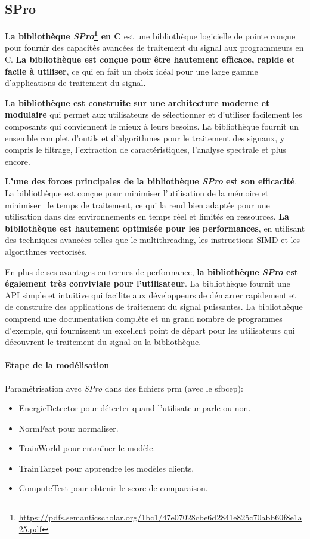 \subsection{SPro}
\label{subsec:SPro}

\textbf{La bibliothèque \textit{SPro}\footnote{\url{https://pdfs.semanticscholar.org/1bc1/47e07028cbe6d2841e825c70abb60f8e1a25.pdf}} en C} est une bibliothèque logicielle de pointe conçue pour fournir des capacités avancées de traitement du signal
aux programmeurs en C. \textbf{La bibliothèque est conçue pour être hautement efficace, rapide et facile à utiliser}, ce qui en fait un choix idéal
pour une large gamme d'applications de traitement du signal.

\textbf{La bibliothèque est construite sur une architecture moderne et modulaire} qui permet aux utilisateurs de sélectionner et d'utiliser facilement
les composants qui conviennent le mieux à leurs besoins. La bibliothèque fournit un ensemble complet d'outils et d'algorithmes pour le traitement des signaux,
y compris le filtrage, l'extraction de caractéristiques, l'analyse spectrale et plus encore.

\textbf{L'une des forces principales de la bibliothèque \textit{SPro} est son efficacité}. La bibliothèque est conçue pour minimiser l'utilisation de la mémoire et minimiser \
le temps de traitement, ce qui la rend bien adaptée pour une utilisation dans des environnements en temps réel et limités en ressources. \textbf{La bibliothèque est hautement optimisée pour
    les performances}, en utilisant des techniques avancées telles que le multithreading, les instructions SIMD et les algorithmes vectorisés.

En plus de ses avantages en termes de performance, \textbf{la bibliothèque \textit{SPro} est également très conviviale pour l'utilisateur}. La bibliothèque fournit une API simple
et intuitive qui facilite aux développeurs de démarrer rapidement et de construire des applications de traitement du signal puissantes. La bibliothèque comprend une documentation
complète et un grand nombre de programmes d'exemple, qui fournissent un excellent point de départ pour les utilisateurs qui découvrent le traitement du signal ou la bibliothèque.\\
\paragraph*{Etape de la modélisation}

Paramétrisation avec \textit{SPro} dans des fichiers prm (avec le sfbcep):
\begin{itemize}
    \item EnergieDetector pour détecter quand l'utilisateur parle ou non.
    \item NormFeat pour normaliser.
    \item TrainWorld pour entraîner le modèle.
    \item TrainTarget pour apprendre les modèles clients.
    \item ComputeTest pour obtenir le score de comparaison.
\end{itemize}

